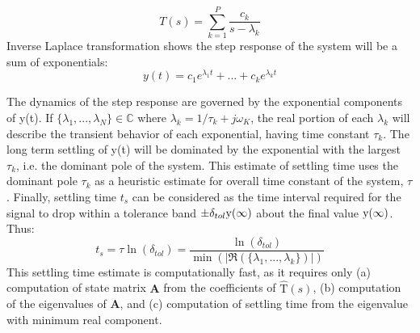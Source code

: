 	\begin{equation}
		T(s) = \sum_{k=1}^{P} \frac{c_k}{s-\lambda_k}
	\end{equation}
	Inverse Laplace transformation shows the step response of the system will be a sum of exponentials:
	\begin{equation}
		y(t) = c_1e^{\lambda_1t} + ... + c_ke^{\lambda_kt}%
	\end{equation}


	The dynamics of the step response are governed by the exponential components of y(t). If  $\{\lambda_1, ... , \lambda_N\} \in \mathds{C}$ where $\lambda_k=1/\tau_k+j\omega_K$, the real portion of each $\lambda_k$ will describe the transient behavior of each exponential, having time constant $\tau_k$. The long term settling of y(t) will be dominated by the exponential with the largest $\tau_k$, i.e. the dominant pole of the system. This estimate of settling time uses the dominant pole $\tau_k$ as a heuristic estimate for overall time constant of the system, $\tau$. Finally, settling time $t_s$ can be considered as the time interval required for the signal to drop within a tolerance band $\pm \delta_{tol} \textnormal{y}(\infty)$ about the final value $\textnormal{y}(\infty)$. Thus:
	\begin{equation}
		t_s = \tau\ln(\delta_{tol}) = \frac{\ln(\delta_{tol})}{\min(|\Re(\{\lambda_1, ... , \lambda_k\})|)}
	\end{equation}
	This settling time estimate is computationally fast, as it requires only (a) computation of state matrix $\mathbf{A}$ from the coefficients of $\mathrm{\hat{T}}(s)$, (b) computation of the eigenvalues of $\mathbf{A}$, and (c) computation of settling time from the eigenvalue with minimum real component.


